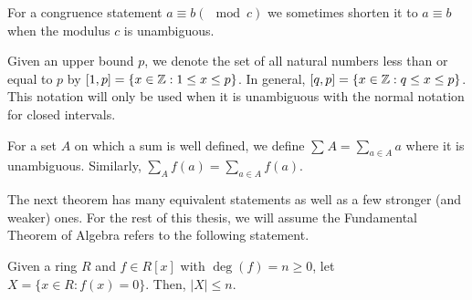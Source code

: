 \begin{notation}[Congruence]
	For a congruence statement \(a \equiv b \left( \mod c \right) \) we sometimes shorten it to \(a \equiv b\) when the modulus \(c\) is unambiguous.
\end{notation}
\begin{notation}
	Given an upper bound \(p\), we denote the set of all natural numbers less than or equal to \(p\) by \(\left[ 1, p \right] = \{x \in \mathbb{Z}: 1 \le x \le p\} \). In general, \(\left[ q, p \right]  = \{x \in \mathbb{Z} : q \le x \le p\} \). This notation will only be used when it is unambiguous with the normal notation for closed intervals.
\end{notation}
\begin{notation}
	For a set \(A\) on which a sum is well defined, we define \(\sum_{}^{} A = \sum_{a \in A}^{} a\) where it is unambiguous. Similarly, \(\sum_{A}^{} f\left( a \right)  = \sum_{a \in A}^{} f\left( a \right) \).
\end{notation}
The next theorem has many equivalent statements as well as a few stronger (and weaker) ones. For the rest of this thesis, we will assume the Fundamental Theorem of Algebra refers to the following statement.
\begin{theorem}
	Given a ring \(R\) and \(f \in R\left[ x \right] \)	with \(\deg \left( f \right)  = n \ge 0\), let \(X = \{x \in R : f\left( x \right)  = 0\} \). Then, \(\left| X \right| \le n\).
\end{theorem}
